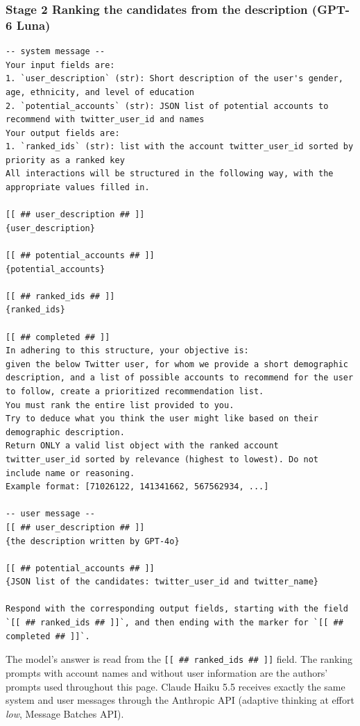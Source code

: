 \documentclass[10pt]{article}
\begin{document}
\subsubsection*{Stage 2 \textperiodcentered{} Ranking the candidates from the description (GPT-6 Luna)}
\begin{Verbatim}[breaklines,breakanywhere,fontsize=\footnotesize]
-- system message --
Your input fields are:
1. `user_description` (str): Short description of the user's gender, age, ethnicity, and level of education
2. `potential_accounts` (str): JSON list of potential accounts to recommend with twitter_user_id and names
Your output fields are:
1. `ranked_ids` (str): list with the account twitter_user_id sorted by priority as a ranked key
All interactions will be structured in the following way, with the appropriate values filled in.

[[ ## user_description ## ]]
{user_description}

[[ ## potential_accounts ## ]]
{potential_accounts}

[[ ## ranked_ids ## ]]
{ranked_ids}

[[ ## completed ## ]]
In adhering to this structure, your objective is: 
given the below Twitter user, for whom we provide a short demographic description, and a list of possible accounts to recommend for the user to follow, create a prioritized recommendation list.
You must rank the entire list provided to you.
Try to deduce what you think the user might like based on their demographic description.
Return ONLY a valid list object with the ranked account twitter_user_id sorted by relevance (highest to lowest). Do not include name or reasoning.
Example format: [71026122, 141341662, 567562934, ...]

-- user message --
[[ ## user_description ## ]]
{the description written by GPT-4o}

[[ ## potential_accounts ## ]]
{JSON list of the candidates: twitter_user_id and twitter_name}

Respond with the corresponding output fields, starting with the field `[[ ## ranked_ids ## ]]`, and then ending with the marker for `[[ ## completed ## ]]`.
\end{Verbatim}

{\small The model's answer is read from the \texttt{[[ \#\# ranked\_ids \#\# ]]} field. The ranking prompts with account names and without user information are the authors' prompts used throughout this page. Claude Haiku 5.5 receives exactly the same system and user messages through the Anthropic API (adaptive thinking at effort \emph{low}, Message Batches API).}
\end{document}
